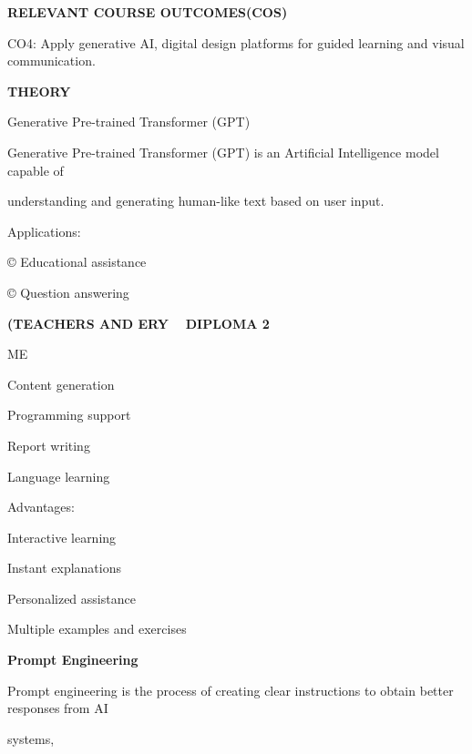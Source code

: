 \documentclass[10pt,a4paper]{article}
\begin{document}
\medskip\noindent\textbf{RELEVANT COURSE OUTCOMES(COS)}\par
\noindent CO4: Apply generative AI, digital design platforms for guided learning and visual communication.\par

\medskip\noindent\textbf{THEORY}\par
\noindent Generative Pre-trained Transformer (GPT)\par
\noindent Generative Pre-trained Transformer (GPT) is an Artificial Intelligence model capable of\par
\noindent understanding and generating human-like text based on user input.\par

\noindent Applications:\par
\noindent © Educational assistance\par
\noindent © Question answering\par
\medskip\noindent\textbf{(TEACHERS AND ERY ~ DIPLOMA 2}\par
\noindent ME\par
\noindent Content generation\par
\noindent Programming support\par
\noindent Report writing\par
\noindent Language learning\par

\noindent Advantages:\par
\noindent Interactive learning\par
\clearpage
\noindent Instant explanations\par
\noindent Personalized assistance\par
\noindent Multiple examples and exercises\par

\medskip\noindent\textbf{Prompt Engineering}\par
\noindent Prompt engineering is the process of creating clear instructions to obtain better responses from AI\par
\noindent systems,\par
\end{document}
